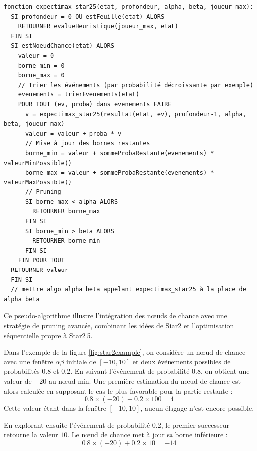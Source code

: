 \documentclass[11pt]{article}
\begin{document}
{\small
  \begin{verbatim}
fonction expectimax_star25(etat, profondeur, alpha, beta, joueur_max):
  SI profondeur = 0 OU estFeuille(etat) ALORS
    RETOURNER evalueHeuristique(joueur_max, etat)
  FIN SI
  SI estNoeudChance(etat) ALORS
    valeur = 0
    borne_min = 0
    borne_max = 0
    // Trier les événements (par probabilité décroissante par exemple)
    evenements = trierEvenements(etat)
    POUR TOUT (ev, proba) dans evenements FAIRE
      v = expectimax_star25(resultat(etat, ev), profondeur-1, alpha, beta, joueur_max)
      valeur = valeur + proba * v
      // Mise à jour des bornes restantes
      borne_min = valeur + sommeProbaRestante(evenements) * valeurMinPossible()
      borne_max = valeur + sommeProbaRestante(evenements) * valeurMaxPossible()
      // Pruning
      SI borne_max < alpha ALORS
        RETOURNER borne_max
      FIN SI
      SI borne_min > beta ALORS
        RETOURNER borne_min
      FIN SI
    FIN POUR TOUT
  RETOURNER valeur
  FIN SI
  // mettre algo alpha beta appelant expectimax_star25 à la place de alpha beta
  \end{verbatim}
}

Ce pseudo-algorithme illustre l’intégration des nœuds de chance avec une stratégie de pruning avancée, combinant les idées de Star2 et l’optimisation séquentielle propre à Star2.5.

Dans l'exemple de la figure \ref{fig:star2example}, on considère un nœud de chance avec une fenêtre 
$\alpha\beta$ initiale de $[-10, 10]$ et deux événements possibles 
de probabilités 0.8 et 0.2. En suivant l'événement de probabilité 
0.8, on obtient une valeur de $-20$ au nœud min. Une première 
estimation du nœud de chance est alors calculée en supposant le cas 
le plus favorable pour la partie restante :
$$0.8 \times (-20) + 0.2 \times 100 = 4$$
Cette valeur étant dans la fenêtre $[-10, 10]$, aucun élagage n'est 
encore possible.


En explorant ensuite l'événement de probabilité 0.2, le premier 
successeur retourne la valeur $10$. Le nœud de chance met à jour 
sa borne inférieure :
$$0.8 \times (-20) + 0.2 \times 10 = -14$$
\end{document}
